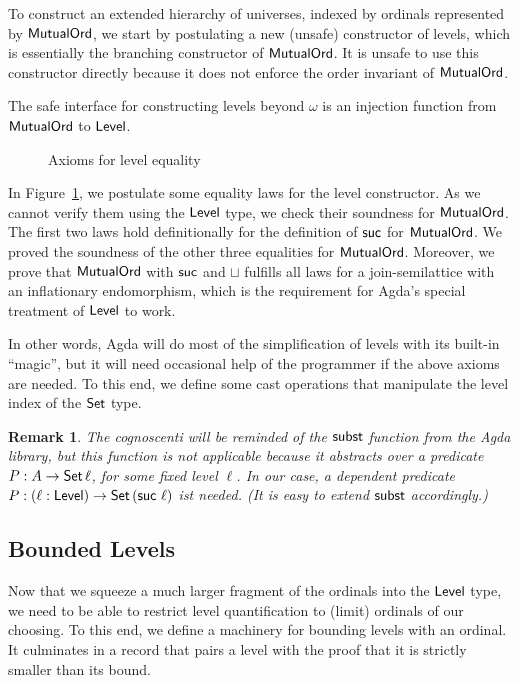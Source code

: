 \documentclass[manuscript,screen,review,anonymous]{acmart}
\newtheorem{remark}{Remark}
\begin{document}
To construct an extended hierarchy of universes, indexed by ordinals
represented by $\AMutualOrd$, 
we start by postulating a new (unsafe) constructor of levels, which is
essentially the branching constructor of $\AMutualOrd$. It is unsafe
to use this constructor directly because it does not enforce the order invariant of $\AMutualOrd$.

\LCantor

The safe interface for constructing levels beyond $\omega$ is an
injection function from $\AMutualOrd$ to $\ALevel$.

\LtoLevel

\begin{figure}[tp]
  \LAxioms
  \caption{Axioms for level equality}
  \label{fig:axioms-level-equality}
\end{figure}
In Figure~\ref{fig:axioms-level-equality}, we postulate some equality
laws for the level constructor. As we cannot verify them using the
$\ALevel$ type, we check their soundness for $\AMutualOrd$.
The first two laws hold definitionally for the definition of $\Asuc$
for $\AMutualOrd$. We proved the soundness of the other three
equalities for $\AMutualOrd$.
Moreover, we prove that $\AMutualOrd$ with $\Asuc$ and $\sqcup$ fulfills all laws
for a join-semilattice with an inflationary endomorphism, which is the
requirement for Agda's special treatment of $\ALevel$ to work.

In other words, Agda will do most of the simplification of levels with
its built-in ``magic'', but it will need occasional help of the
programmer if the above axioms are needed. To this end, we define some
cast operations that manipulate the level index of the $\ASet$ type.

\Lcast

\begin{remark}
  The cognoscenti will be reminded of the $\Asubst$ function from the
  Agda library, but this function is not applicable because it
  abstracts over a predicate $P : A \to \ASeti\ell$, for some fixed
  level $\ell$. In our case, a \emph{dependent} predicate
  $P : (\ell : \ALevel) \to \ASeti{(\Asuc~\ell)}$ ist needed. (It is
  easy to extend $\Asubst$ accordingly.)
\end{remark}

\subsection{Bounded Levels}
\label{sec:bounded-levels}

Now that we squeeze a much larger fragment of the ordinals into the
$\ALevel$ type, we need to be able to restrict level quantification to
(limit) ordinals of our choosing. To this end, we define a machinery
for bounding levels with an ordinal. It culminates in a record that
pairs a level with the proof that it is strictly smaller than its bound.
\end{document}
